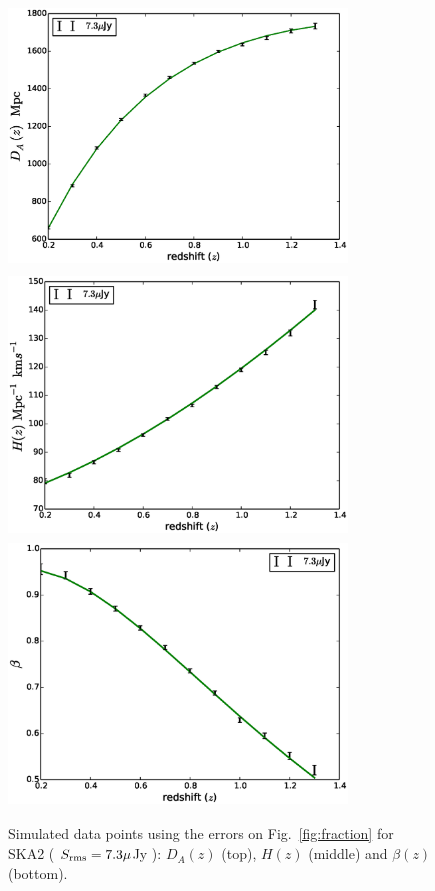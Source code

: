 \documentclass[useAMS,usenatbib]{mn2e}
\begin{document}
\begin{center}
\begin{figure}
\includegraphics[height=7cm,width=9cm]{plots/DA_errs_7point3mJy_modified_diff_14bins.eps}
\includegraphics[height=7cm,width=9cm]{plots/Hz_errs_7point3mJy_modified_diff_14bins.eps}
\includegraphics[height=7cm,width=9cm]{plots/beta_errs_7point3mJy_modified_diff_14bins.eps}
\caption{Simulated data points using the errors on Fig.~\ref{fig:fraction} for SKA2 ( $S_{\rm rms} = 7.3 \mu $Jy ): $D_A(z)$ (top), $H(z)$ (middle) and $\beta(z)$ (bottom).}
\label{fig:H_z_D_a_f}
\end{figure}
\end{center}
\end{document}
